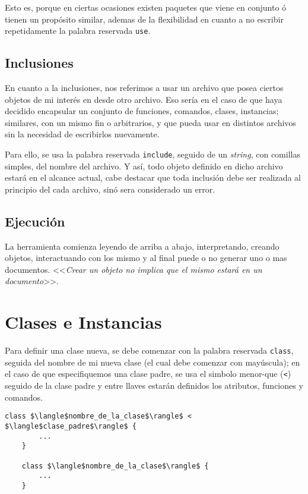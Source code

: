 \documentclass[12pt,letterpaper,titlepage,oneside,openright]{book}
\newcommand{\OhTeX}{%
    \makebox[0.76em][c]{O}%
    \makebox[0.25em][c]{%
        \raisebox{0.14em}[0em][0em]{%
            \fontsize{0.5em}{0cm}%
                \selectfont H%
        }%
    }%
    \makebox[1.35em][c]{\TeX}%
}
\newcommand{\ohtex}{\OhTeX\xspace}
\begin{document}
Esto es, porque en ciertas ocasiones existen paquetes que viene en conjunto ó
tienen un propósito similar, ademas de la flexibilidad en cuanto a no escribir
repetidamente la palabra reservada \texttt{use}.

\subsection{Inclusiones}

En cuanto a la inclusiones, nos referimos a usar un archivo \ohtex que posea ciertos objetos de mi interés en desde otro archivo. Eso sería en el caso de que haya decidido encapsular un conjunto de funciones, comandos, clases, instancias; similares, con un mismo fin o arbitrarios, y que pueda usar en distintos archivos sin la necesidad de escribirlos nuevamente.

Para ello, se usa la palabra reservada \texttt{include}, seguido de un \textit{string}, con comillas simples, del nombre del archivo. Y así, todo objeto definido en dicho archivo estará en el alcance actual, cabe destacar que toda inclusión debe ser realizada al principio del cada archivo, sinó sera considerado un error.

\subsection{Ejecución}

La herramienta comienza leyendo de arriba a abajo, interpretando, creando
objetos, interactuando con los mismo y al final puede o no generar uno o mas
documentos. <<\textit{Crear un objeto no implica que el mismo estará en un
documento}>>.

\section{Clases e Instancias}

Para definir una clase nueva, se debe comenzar con la palabra reservada \texttt{class}, seguida del nombre de mi nueva clase (el cual debe comenzar con mayúscula); en el caso de que especifiquemos una clase padre, se usa el simbolo menor-que (\texttt{<}) seguido de la clase padre y entre llaves estarán definidos los atributos, funciones y comandos.

\begin{center}
\begin{lstlisting}[mathescape]
    class $\langle$nombre_de_la_clase$\rangle$ < $\langle$clase_padre$\rangle$ {
        ...
    }

    class $\langle$nombre_de_la_clase$\rangle$ {
        ...
    }
\end{lstlisting}
\end{center}
\end{document}
